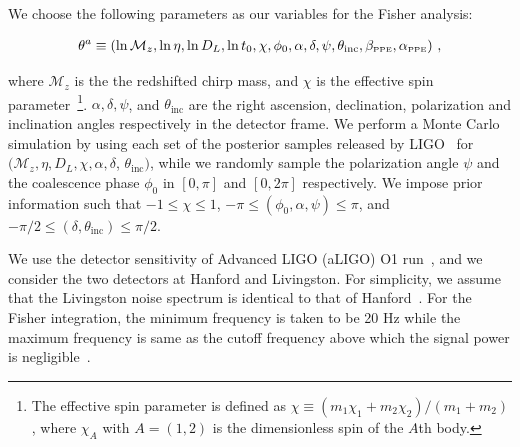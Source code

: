 \documentclass[prd,twocolumn,nofootinbib]{revtex4-1}
\newcommand\ba{\begin{eqnarray}}
\newcommand\ea{\end{eqnarray}}
\newcommand\bw{\begin{widetext}}
\newcommand\ew{\end{widetext}}
\newcommand{\lb}{\left(}
\newcommand{\rb}{\right)}
\newcommand{\PPE}{{\mbox{\tiny PPE}}}
\begin{document}
We choose the following parameters as our variables for the Fisher analysis:
\bw
\ba\label{parameters}
\theta^a\equiv \lb \ln{\mathcal{M}_z}, \ln{\eta}, \ln{D_L}, \ln{t_0}, \chi, \phi_0, \alpha, \delta, \psi, \theta_{\text{inc}}, \beta_{\PPE}, \alpha_{\PPE} \rb\,,
\ea
\ew
where $\mathcal{M}_z$ is the the redshifted chirp mass, and $\chi$ is the effective spin parameter~\footnote{The effective spin parameter is defined as $\chi\equiv\lb m_1 \chi_1+m_2\chi_2\rb /\lb m_1+m_2\rb$, where $\chi_A$ with $A=(1,2)$ is the dimensionless spin of the $A$th body.}. $\alpha, \delta, \psi$, and  $\theta_{\text{inc}}$ are the right ascension, declination, polarization and inclination angles respectively in the detector frame.
We perform a Monte Carlo simulation by using each set of the posterior samples released by LIGO~\cite{ligo:sample} for $(\mathcal{M}_z, \eta, D_L, \chi, \alpha, \delta$, $\theta_{\text{inc}})$, while we randomly sample the polarization angle $\psi$ and the coalescence phase $\phi_0$ in $[0,\pi]$ and $[0,2\pi]$ respectively.
We impose prior information such that $-1 \leq \chi \leq 1$, $-\pi \leq (\phi_0, \alpha, \psi) \leq \pi$, and $-\pi/2 \leq ( \delta, \theta_{\text{inc}}) \leq \pi/2$.

We use the detector sensitivity of Advanced LIGO (aLIGO) O1 run~\cite{LIGOScientific:2018mvr}, and we consider the two detectors at Hanford and Livingston. For simplicity, we assume that the Livingston noise spectrum is identical to that of  Hanford~\cite{Yunes:2009yz}. For the Fisher integration, the minimum frequency is taken to be 20 Hz while the maximum frequency is same as the cutoff frequency above which the signal power is negligible~\cite{Ajith:2009bn}.
\end{document}

